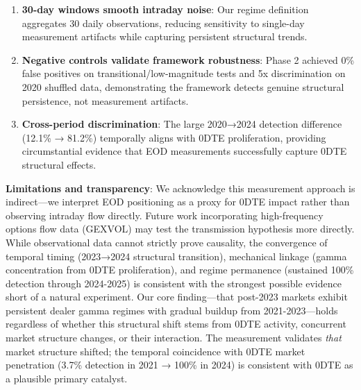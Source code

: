 \begin{enumerate}
\item \textbf{30-day windows smooth intraday noise}: Our regime definition aggregates 30 daily observations, reducing sensitivity to single-day measurement artifacts while capturing persistent structural trends.

\item \textbf{Negative controls validate framework robustness}: Phase 2 achieved 0\% false positives on transitional/low-magnitude tests and 5x discrimination on 2020 shuffled data, demonstrating the framework detects genuine structural persistence, not measurement artifacts.

\item \textbf{Cross-period discrimination}: The large 2020→2024 detection difference (12.1\% → 81.2\%) temporally aligns with 0DTE proliferation, providing circumstantial evidence that EOD measurements successfully capture 0DTE structural effects.
\end{enumerate}

\vspace{0.2cm}

\noindent\textbf{Limitations and transparency}: We acknowledge this measurement approach is indirect—we interpret EOD positioning as a proxy for 0DTE impact rather than observing intraday flow directly. Future work incorporating high-frequency options flow data (GEX\textunderscore VOL) may test the transmission hypothesis more directly. While observational data cannot strictly prove causality, the convergence of temporal timing (2023→2024 structural transition), mechanical linkage (gamma concentration from 0DTE proliferation), and regime permanence (sustained 100\% detection through 2024-2025) is consistent with the strongest possible evidence short of a natural experiment. Our core finding—that post-2023 markets exhibit persistent dealer gamma regimes with gradual buildup from 2021-2023—holds regardless of whether this structural shift stems from 0DTE activity, concurrent market structure changes, or their interaction. The measurement validates \textit{that} market structure shifted; the temporal coincidence with 0DTE market penetration (3.7\% detection in 2021 → 100\% in 2024) is consistent with 0DTE as a plausible primary catalyst.

\vspace{0.3cm}

